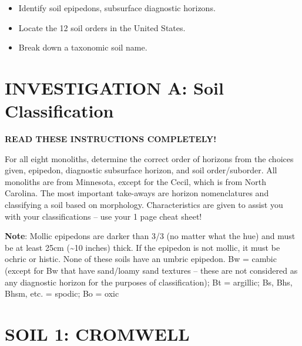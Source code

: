\documentclass[
  letterpaper,
  twocolumn,
  portrait]{scrbook}
\providecommand{\tightlist}{%
  \setlength{\itemsep}{0pt}\setlength{\parskip}{0pt}}\usepackage{longtable,booktabs,array}
\begin{document}
\begin{tcolorbox}[enhanced jigsaw, colframe=quarto-callout-note-color-frame, coltitle=black, arc=.35mm, breakable, bottomrule=.15mm, colback=white, rightrule=.15mm, toprule=.15mm, opacityback=0, bottomtitle=1mm, left=2mm, titlerule=0mm, leftrule=.75mm, opacitybacktitle=0.6, toptitle=1mm, title=\textcolor{quarto-callout-note-color}{\faInfo}\hspace{0.5em}{Objectives}, colbacktitle=quarto-callout-note-color!10!white]

\begin{itemize}
\tightlist
\item
  Identify soil epipedons, subsurface diagnostic horizons.
\item
  Locate the 12 soil orders in the United States.
\item
  Break down a taxonomic soil name.
\end{itemize}

\end{tcolorbox}

\hypertarget{investigation-a-soil-classification}{%
\section{INVESTIGATION A: Soil
Classification}\label{investigation-a-soil-classification}}

\textbf{READ THESE INSTRUCTIONS COMPLETELY!}

For all eight monoliths, determine the correct order of horizons from
the choices given, epipedon, diagnostic subsurface horizon, and soil
order/suborder. All monoliths are from Minnesota, except for the Cecil,
which is from North Carolina. The most important take-aways are horizon
nomenclatures and classifying a soil based on morphology.
Characteristics are given to assist you with your classifications -- use
your 1 page cheat sheet!

\textbf{Note}: Mollic epipedons are darker than 3/3 (no matter what the
hue) and must be at least 25cm (\textasciitilde10 inches) thick. If the
epipedon is not mollic, it must be ochric or histic. None of these soils
have an umbric epipedon. Bw = cambic (except for Bw that have sand/loamy
sand textures -- these are not considered as any diagnostic horizon for
the purposes of classification); Bt = argillic; Bs, Bhs, Bhsm, etc. =
spodic; Bo = oxic

\hypertarget{soil-1-cromwell}{%
\section{SOIL 1: CROMWELL}\label{soil-1-cromwell}}
\end{document}
